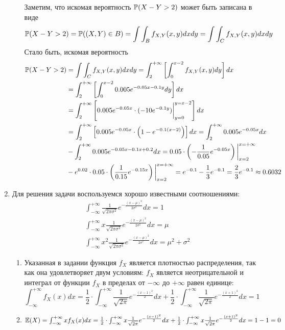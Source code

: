 \begin{enumerate}
\begin{enumerate}
Заметим, что искомая вероятность  $\P(X-Y > 2)$ может быть записана в виде
\[
\P(X-Y > 2) = \P((X, Y) \in B ) = \int \int_B f_{X, Y} (x, y) dx dy = \int \int_C f_{X, Y} (x, y) dx dy
\]
Стало быть, искомая вероятность
\begin{align*}
\P(X-Y > 2) &= \int \int_C f_{X, Y} (x, y) dx dy = \int_{2}^{+\infty} \left[ \int_{0}^{x-2} f_{X, Y} (x, y) dy \right] dx \\
&= \int_{2}^{+\infty} \left[ \int_{0}^{x-2} 0.005e^{-0.05x-0.1y}dy \right] dx \\
&= \int_{2}^{+\infty} \left[ 0.005e^{-0.05x} \cdot (-10e^{-0.1y}) \bigg\vert_{y=0}^{y=x-2} \right] dx  \\
&=  \int_{2}^{+\infty} \left[ 0.005e^{-0.05x} \cdot\left(1-e^{-0.1(x-2)}  \right) \right] dx  = \int_{2}^{+\infty} 0.005e^{-0.05x} dx \\
&- \int_{2}^{+\infty} 0.005e^{-0.05x-0.1x+0.2} dx
= 0.05 \cdot \left( -\frac{1}{0.05}e^{-0.05x}  \right) \bigg\vert_{x=2}^{x=+\infty} \\
&- e^{0.02} \cdot 0.05 \cdot \left( \frac{1}{0.15} e^{-0.15x} \right) \bigg\vert_{x=2}^{x=+\infty}
= e^{-0.1} -\frac{1}{3} e^{-0.1} = \frac{2}{3}e^{-0.1}  \approx 0.6032
\end{align*}
\end{enumerate}
\item Для решения задачи воспользуемся хорошо известными соотношениями:
\begin{align*}
&\int_{-\infty}^{+\infty} \frac{1}{\sqrt{2\pi\sigma^2}} e^{-\frac{(x-\mu)^2}{2\sigma^2}} dx = 1 \\
&\int_{-\infty}^{+\infty} x\frac{1}{\sqrt{2\pi\sigma^2}} e^{-\frac{(x-\mu)^2}{2\sigma^2}} dx = \mu \\
&\int_{-\infty}^{+\infty} x^2 \frac{1}{\sqrt{2\pi\sigma^2}} e^{-\frac{(x-\mu)^2}{2\sigma^2}} dx = \mu^2 + \sigma^2
\end{align*}
\begin{enumerate}
\item Указанная в задании функция $f_X$ является плотностью распределения, так как она удовлетворяет двум условиям:  $f_X$ является неотрицательной и интеграл от функции $f_X$ в пределах от  $-\infty$ до $+\infty$ равен единице:
\[
\int_{-\infty}^{+\infty} f_X (x) dx = \frac{1}{2} \cdot \int_{-\infty}^{+\infty}  \frac{1}{\sqrt{2\pi}} e^{-\frac{(x-1)^2}{2}} dx  + \frac{1}{2} \cdot \int_{-\infty}^{+\infty}  \frac{1}{\sqrt{2\pi}} e^{-\frac{(x+1)^2}{2}} dx = 1
\]
\item $\E(X) =\int_{-\infty}^{+\infty} xf_X (x) dx =  \frac{1}{2} \cdot \int_{-\infty}^{+\infty} x \frac{1}{\sqrt{2\pi}} e^{-\frac{(x-1)^2}{2}} dx  + \frac{1}{2} \cdot \int_{-\infty}^{+\infty}  x \frac{1}{\sqrt{2\pi}} e^{-\frac{(x+1)^2}{2}} dx = 1- 1=  0$

\end{enumerate}
\end{enumerate}
